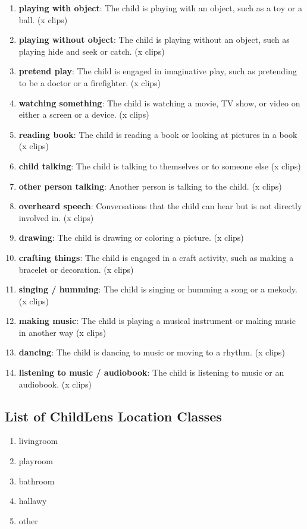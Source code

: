 \documentclass[
  man,floatsintext]{apa6}
\providecommand{\tightlist}{%
  \setlength{\itemsep}{0pt}\setlength{\parskip}{0pt}}
\begin{document}
\begin{enumerate}
\def\labelenumi{\arabic{enumi}.}
\tightlist
\item
  \textbf{playing with object}: The child is playing with an object, such as a toy or a ball. (x clips)
\item
  \textbf{playing without object}: The child is playing without an object, such as playing hide and seek or catch. (x clips)
\item
  \textbf{pretend play}: The child is engaged in imaginative play, such as pretending to be a doctor or a firefighter. (x clips)
\item
  \textbf{watching something}: The child is watching a movie, TV show, or video on either a screen or a device. (x clips)
\item
  \textbf{reading book}: The child is reading a book or looking at pictures in a book (x clips)
\item
  \textbf{child talking}: The child is talking to themselves or to someone else (x clips)
\item
  \textbf{other person talking}: Another person is talking to the child. (x clips)
\item
  \textbf{overheard speech}: Conversations that the child can hear but is not directly involved in. (x clips)
\item
  \textbf{drawing}: The child is drawing or coloring a picture. (x clips)
\item
  \textbf{crafting things}: The child is engaged in a craft activity, such as making a bracelet or decoration. (x clips)
\item
  \textbf{singing / humming}: The child is singing or humming a song or a mekody. (x clips)
\item
  \textbf{making music}: The child is playing a musical instrument or making music in another way (x clips)
\item
  \textbf{dancing}: The child is dancing to music or moving to a rhythm. (x clips)
\item
  \textbf{listening to music / audiobook}: The child is listening to music or an audiobook. (x clips)
\end{enumerate}

\subsection{List of ChildLens Location Classes}\label{list-of-childlens-location-classes}

\begin{enumerate}
\def\labelenumi{\arabic{enumi}.}
\tightlist
\item
  livingroom
\item
  playroom
\item
  bathroom
\item
  hallawy
\item
  other
\end{enumerate}
\end{document}
